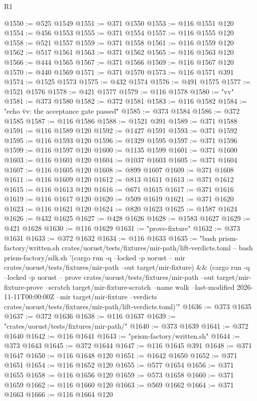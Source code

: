 \begin{lexlean}{R1}
\begin{coremodule}
@1550 := @525 @1549
@1551 := @371 @1550
@1553 := @116 @1551 @120
@1554 := @456 @1553
@1555 := @371 @1554
@1557 := @116 @1555 @120
@1558 := @521 @1557
@1559 := @371 @1558
@1561 := @116 @1559 @120
@1562 := @517 @1561
@1563 := @371 @1562
@1565 := @116 @1563 @120
@1566 := @444 @1565
@1567 := @371 @1566
@1569 := @116 @1567 @120
@1570 := @440 @1569
@1571 := @371 @1570
@1573 := @116 @1571 @391
@1574 := @1525 @1573
@1575 := @432 @1574
@1576 := @491 @1575
@1577 := @1521 @1576
@1578 := @421 @1577
@1579 := @116 @1578
@1580 := "vv"
@1581 := @373 @1580
@1582 := @372 @1581
@1583 := @116 @1582
@1584 := "echo \"vv: the acceptance gate passed\""
@1585 := @373 @1584
@1586 := @372 @1585
@1587 := @116 @1586
@1588 := @1521 @391
@1589 := @371 @1588
@1591 := @116 @1589 @120
@1592 := @1427 @1591
@1593 := @371 @1592
@1595 := @116 @1593 @120
@1596 := @1329 @1595
@1597 := @371 @1596
@1599 := @116 @1597 @120
@1600 := @1135 @1599
@1601 := @371 @1600
@1603 := @116 @1601 @120
@1604 := @1037 @1603
@1605 := @371 @1604
@1607 := @116 @1605 @120
@1608 := @899 @1607
@1609 := @371 @1608
@1611 := @116 @1609 @120
@1612 := @813 @1611
@1613 := @371 @1612
@1615 := @116 @1613 @120
@1616 := @671 @1615
@1617 := @371 @1616
@1619 := @116 @1617 @120
@1620 := @509 @1619
@1621 := @371 @1620
@1623 := @116 @1621 @120
@1624 := @820 @1623
@1625 := @1587 @1624
@1626 := @432 @1625
@1627 := @428 @1626
@1628 := @1583 @1627
@1629 := @421 @1628
@1630 := @116 @1629
@1631 := "prove-fixture"
@1632 := @373 @1631
@1633 := @372 @1632
@1634 := @116 @1633
@1635 := "bash prism-factory/written.sh crates/uorust/tests/fixtures/mir-path/lift-verdicts.toml -- bash prism-factory/sdk.sh '(cargo run -q --locked -p uorust -- mir crates/uorust/tests/fixtures/mir-path --out target/mir-fixture) && (cargo run -q --locked -p uorust -- prove crates/uorust/tests/fixtures/mir-path --out target/mir-fixture-prove --scratch target/mir-fixture-scratch --name walk --last-modified 2026-11-11T00:00:00Z --mir target/mir-fixture --verdicts crates/uorust/tests/fixtures/mir-path/lift-verdicts.toml)'"
@1636 := @373 @1635
@1637 := @372 @1636
@1638 := @116 @1637
@1639 := "crates/uorust/tests/fixtures/mir-path/"
@1640 := @373 @1639
@1641 := @372 @1640
@1642 := @116 @1641
@1643 := "prism-factory/written.sh"
@1644 := @373 @1643
@1645 := @372 @1644
@1647 := @116 @1645 @391
@1648 := @371 @1647
@1650 := @116 @1648 @120
@1651 := @1642 @1650
@1652 := @371 @1651
@1654 := @116 @1652 @120
@1655 := @577 @1654
@1656 := @371 @1655
@1658 := @116 @1656 @120
@1659 := @573 @1658
@1660 := @371 @1659
@1662 := @116 @1660 @120
@1663 := @569 @1662
@1664 := @371 @1663
@1666 := @116 @1664 @120

\end{coremodule}
\end{lexlean}
